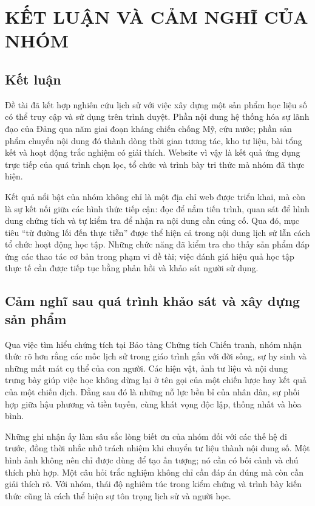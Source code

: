 \chapter{KẾT LUẬN VÀ CẢM NGHĨ CỦA NHÓM}

\section{Kết luận}

Đề tài đã kết hợp nghiên cứu lịch sử với việc xây dựng một sản phẩm học liệu số có thể truy cập và sử dụng trên trình duyệt. Phần nội dung hệ thống hóa sự lãnh đạo của Đảng qua năm giai đoạn kháng chiến chống Mỹ, cứu nước; phần sản phẩm chuyển nội dung đó thành dòng thời gian tương tác, kho tư liệu, bài tổng kết và hoạt động trắc nghiệm có giải thích. Website vì vậy là kết quả ứng dụng trực tiếp của quá trình chọn lọc, tổ chức và trình bày tri thức mà nhóm đã thực hiện.

Kết quả nổi bật của nhóm không chỉ là một địa chỉ web được triển khai, mà còn là sự kết nối giữa các hình thức tiếp cận: đọc để nắm tiến trình, quan sát để hình dung chứng tích và tự kiểm tra để nhận ra nội dung cần củng cố. Qua đó, mục tiêu “từ đường lối đến thực tiễn” được thể hiện cả trong nội dung lịch sử lẫn cách tổ chức hoạt động học tập. Những chức năng đã kiểm tra cho thấy sản phẩm đáp ứng các thao tác cơ bản trong phạm vi đề tài; việc đánh giá hiệu quả học tập thực tế cần được tiếp tục bằng phản hồi và khảo sát người sử dụng.

\section{Cảm nghĩ sau quá trình khảo sát và xây dựng sản phẩm}

Qua việc tìm hiểu chứng tích tại Bảo tàng Chứng tích Chiến tranh, nhóm nhận thức rõ hơn rằng các mốc lịch sử trong giáo trình gắn với đời sống, sự hy sinh và những mất mát cụ thể của con người. Các hiện vật, ảnh tư liệu và nội dung trưng bày giúp việc học không dừng lại ở tên gọi của một chiến lược hay kết quả của một chiến dịch. Đằng sau đó là những nỗ lực bền bỉ của nhân dân, sự phối hợp giữa hậu phương và tiền tuyến, cùng khát vọng độc lập, thống nhất và hòa bình.

Những ghi nhận ấy làm sâu sắc lòng biết ơn của nhóm đối với các thế hệ đi trước, đồng thời nhắc nhở trách nhiệm khi chuyển tư liệu thành nội dung số. Một hình ảnh không nên chỉ được dùng để tạo ấn tượng; nó cần có bối cảnh và chú thích phù hợp. Một câu hỏi trắc nghiệm không chỉ cần đáp án đúng mà còn cần giải thích rõ. Với nhóm, thái độ nghiêm túc trong kiểm chứng và trình bày kiến thức cũng là cách thể hiện sự tôn trọng lịch sử và người học.

